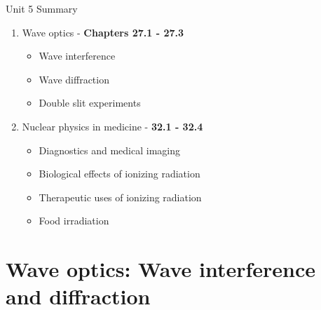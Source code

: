 \documentclass{beamer}
\begin{document}
\begin{frame}{Unit 5 Summary}
\begin{enumerate}
\item Wave optics - \textbf{Chapters 27.1 - 27.3}
\begin{itemize}
\item Wave interference
\item Wave diffraction
\item Double slit experiments
\end{itemize}
\item Nuclear physics in medicine - \textbf{32.1 - 32.4}
\begin{itemize}
\item Diagnostics and medical imaging
\item Biological effects of ionizing radiation
\item Therapeutic uses of ionizing radiation
\item Food irradiation
\end{itemize}
\end{enumerate}
\end{frame}

\section{Wave optics: Wave interference and diffraction}
\end{document}
